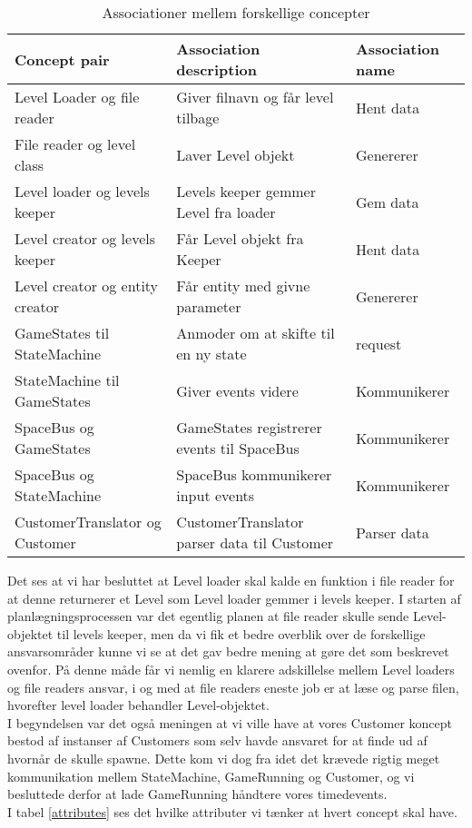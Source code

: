 \begin{table}[!h]
\hspace{-60pt}
\begin{tabular}{|l|l|l|}
\hline
\textbf{Concept pair}           & \textbf{Association description}      & \textbf{Association name} \\ \hline
Level Loader og file reader     & Giver filnavn og får level tilbage    & Hent data                 \\ \hline
File reader og level class      & Laver Level objekt                    & Genererer                 \\ \hline
Level loader og levels keeper   & Levels keeper gemmer Level fra loader & Gem data                  \\ \hline
Level creator og levels keeper  & Får Level objekt fra Keeper           & Hent data                 \\ \hline
Level creator og entity creator & Får entity med givne parameter        & Genererer                 \\ \hline
GameStates til StateMachine & Anmoder om at skifte til en ny state & request \\ \hline
StateMachine til GameStates & Giver events videre & Kommunikerer \\\hline
SpaceBus og GameStates & GameStates registrerer events til SpaceBus & Kommunikerer\\\hline
SpaceBus og StateMachine & SpaceBus kommunikerer input events & Kommunikerer \\\hline
CustomerTranslator og Customer & CustomerTranslator parser data til Customer & Parser data \\ \hline
\end{tabular}
\caption{Associationer mellem forskellige concepter}
\label{associations}
\end{table}

Det ses at vi har besluttet at Level loader skal kalde en funktion i file reader for at denne returnerer et Level som Level loader gemmer i levels keeper. I starten af planlægningsprocessen var det egentlig planen at file reader skulle sende Level-objektet til levels keeper, men da vi fik et bedre overblik over de forskellige ansvarsområder kunne vi se at det gav bedre mening at gøre det som beskrevet ovenfor. På denne måde får vi nemlig en klarere adskillelse mellem Level loaders og file readers ansvar, i og med at file readers eneste job er at læse og parse filen, hvorefter level loader behandler Level-objektet.\\
I begyndelsen var det også meningen at vi ville have at vores Customer koncept bestod af instanser af Customers som selv havde ansvaret for at finde ud af hvornår de skulle spawne. Dette kom vi dog fra idet det krævede rigtig meget kommunikation mellem StateMachine, GameRunning og Customer, og vi besluttede derfor at lade GameRunning håndtere vores timedevents.\\
I tabel \ref{attributes} ses det hvilke attributer vi tænker at hvert concept skal have.

